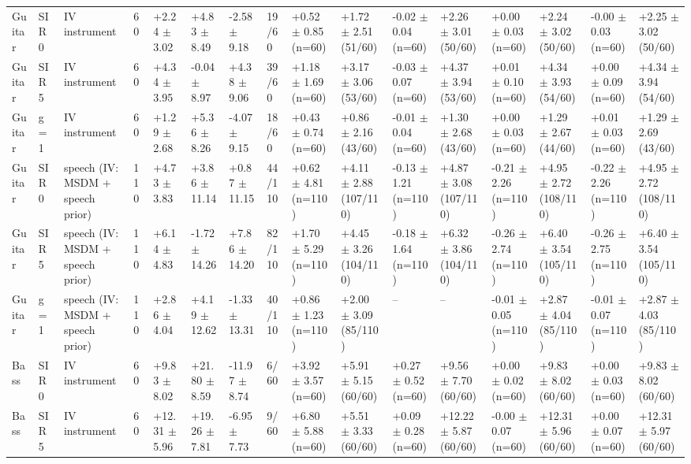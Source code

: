 \begin{tabular}{llllllllllllllll}
Guitar & SIR 0 & IV instrument & 60 & +2.24 $\pm$ 3.02 & +4.83 $\pm$ 8.49 & -2.58 $\pm$ 9.18 & 19/60 & +0.52 $\pm$ 0.85 (n=60) & +1.72 $\pm$ 2.51 (51/60) & -0.02 $\pm$ 0.04 (n=60) & +2.26 $\pm$ 3.01 (50/60) & +0.00 $\pm$ 0.03 (n=60) & +2.24 $\pm$ 3.02 (50/60) & -0.00 $\pm$ 0.03 (n=60) & +2.25 $\pm$ 3.02 (50/60)\\
Guitar & SIR 5 & IV instrument & 60 & +4.34 $\pm$ 3.95 & -0.04 $\pm$ 8.97 & +4.38 $\pm$ 9.06 & 39/60 & +1.18 $\pm$ 1.69 (n=60) & +3.17 $\pm$ 3.06 (53/60) & -0.03 $\pm$ 0.07 (n=60) & +4.37 $\pm$ 3.94 (53/60) & +0.01 $\pm$ 0.10 (n=60) & +4.34 $\pm$ 3.93 (54/60) & +0.00 $\pm$ 0.09 (n=60) & +4.34 $\pm$ 3.94 (54/60)\\
Guitar & g = 1 & IV instrument & 60 & +1.29 $\pm$ 2.68 & +5.36 $\pm$ 8.26 & -4.07 $\pm$ 9.15 & 18/60 & +0.43 $\pm$ 0.74 (n=60) & +0.86 $\pm$ 2.16 (43/60) & -0.01 $\pm$ 0.04 (n=60) & +1.30 $\pm$ 2.68 (43/60) & +0.00 $\pm$ 0.03 (n=60) & +1.29 $\pm$ 2.67 (44/60) & +0.01 $\pm$ 0.03 (n=60) & +1.29 $\pm$ 2.69 (43/60)\\
Guitar & SIR 0 & speech (IV: MSDM + speech prior) & 110 & +4.73 $\pm$ 3.83 & +3.86 $\pm$ 11.14 & +0.87 $\pm$ 11.15 & 44/110 & +0.62 $\pm$ 4.81 (n=110) & +4.11 $\pm$ 2.88 (107/110) & -0.13 $\pm$ 1.21 (n=110) & +4.87 $\pm$ 3.08 (107/110) & -0.21 $\pm$ 2.26 (n=110) & +4.95 $\pm$ 2.72 (108/110) & -0.22 $\pm$ 2.26 (n=110) & +4.95 $\pm$ 2.72 (108/110)\\
Guitar & SIR 5 & speech (IV: MSDM + speech prior) & 110 & +6.14 $\pm$ 4.83 & -1.72 $\pm$ 14.26 & +7.86 $\pm$ 14.20 & 82/110 & +1.70 $\pm$ 5.29 (n=110) & +4.45 $\pm$ 3.26 (104/110) & -0.18 $\pm$ 1.64 (n=110) & +6.32 $\pm$ 3.86 (104/110) & -0.26 $\pm$ 2.74 (n=110) & +6.40 $\pm$ 3.54 (105/110) & -0.26 $\pm$ 2.75 (n=110) & +6.40 $\pm$ 3.54 (105/110)\\
Guitar & g = 1 & speech (IV: MSDM + speech prior) & 110 & +2.86 $\pm$ 4.04 & +4.19 $\pm$ 12.62 & -1.33 $\pm$ 13.31 & 40/110 & +0.86 $\pm$ 1.23 (n=110) & +2.00 $\pm$ 3.09 (85/110) & -- & -- & -0.01 $\pm$ 0.05 (n=110) & +2.87 $\pm$ 4.04 (85/110) & -0.01 $\pm$ 0.07 (n=110) & +2.87 $\pm$ 4.03 (85/110)\\
Bass & SIR 0 & IV instrument & 60 & +9.83 $\pm$ 8.02 & +21.80 $\pm$ 8.59 & -11.97 $\pm$ 8.74 & 6/60 & +3.92 $\pm$ 3.57 (n=60) & +5.91 $\pm$ 5.15 (60/60) & +0.27 $\pm$ 0.52 (n=60) & +9.56 $\pm$ 7.70 (60/60) & +0.00 $\pm$ 0.02 (n=60) & +9.83 $\pm$ 8.02 (60/60) & +0.00 $\pm$ 0.03 (n=60) & +9.83 $\pm$ 8.02 (60/60)\\
Bass & SIR 5 & IV instrument & 60 & +12.31 $\pm$ 5.96 & +19.26 $\pm$ 7.81 & -6.95 $\pm$ 7.73 & 9/60 & +6.80 $\pm$ 5.88 (n=60) & +5.51 $\pm$ 3.33 (60/60) & +0.09 $\pm$ 0.28 (n=60) & +12.22 $\pm$ 5.87 (60/60) & -0.00 $\pm$ 0.07 (n=60) & +12.31 $\pm$ 5.96 (60/60) & +0.00 $\pm$ 0.07 (n=60) & +12.31 $\pm$ 5.97 (60/60)\\

\end{tabular}
